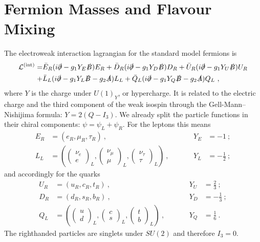 \section{Fermion Masses and Flavour Mixing}
The electroweak interaction lagrangian for the standard model fermions is
\begin{align}\label{eq:LFermion}
	\mathcal{L}^{(\text{int})} = &\bar{E}_R(i\slashed{\partial}-g_1Y_E\slashed{B})E_R + \bar{D}_R(i\slashed{\partial}-g_1Y_D\slashed{B})D_R + \bar{U}_R(i\slashed{\partial}-g_1Y_U\slashed{B})U_R \notag \\
	+ &\bar{L}_L(i\slashed{\partial}-g_1Y_L\slashed{B}-g_2\slashed{A})L_L + \bar{Q}_L(i\slashed{\partial}-g_1Y_Q\slashed{B}-g_2\slashed{A})Q_L \ ,
\end{align}
where $Y$ is the charge under $U(1)_Y$, or hypercharge. It is related to the electric charge and the third component of the weak isospin through the Gell-Mann–Nishijima formula: $Y = 2(Q-I_3)$. We already split the particle functions in their chiral components: $\psi = \psi_L+\psi_R$. For the leptons this means
\begin{align}
	E_R &= (e_R,\mu_R,\tau_R) \ , &&\quad &Y_E &= -1 \ ; \\
	L_L &= \left(\begin{pmatrix} \nu_e \\ e \end{pmatrix}_L,
	\begin{pmatrix} \nu_\mu \\ \mu \end{pmatrix}_L,
	\begin{pmatrix} \nu_\tau \\ \tau \end{pmatrix}_L\right) \ , &&\quad &Y_L &= -\frac{1}{2} \ ;
\end{align}
and accordingly for the quarks
\begin{align}
	U_R &= (u_R,c_R,t_R) \ , &&\quad &Y_U &= \frac{2}{3} \ ; \\
	D_R &= (d_R,s_R,b_R) \ , &&\quad &Y_D &= -\frac{1}{3} \ ; \\
	Q_L &= \left(\begin{pmatrix} u \\ d \end{pmatrix}_L,
	\begin{pmatrix} c \\ s \end{pmatrix}_L,
	\begin{pmatrix} t \\ b \end{pmatrix}_L\right) \ , &&\quad &Y_Q &= \frac{1}{6} \ .	
\end{align}
The righthanded particles are singlets under $SU(2)$ and therefore $I_3=0$.

